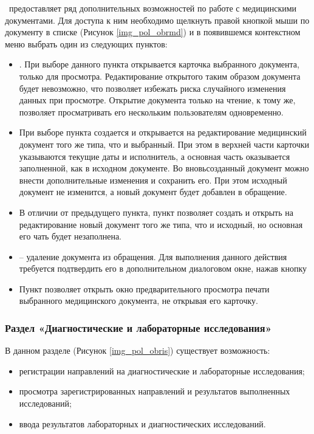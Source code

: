 \tmis~предоставляет ряд дополнительных возможностей по работе с медицинскими документами. Для доступа к ним необходимо щелкнуть правой кнопкой мыши по документу в списке (Рисунок \ref{img_pol_obrmd}) и в появившемся контекстном меню выбрать один из следующих пунктов:
\begin{itemize}
 \item {}. При выборе данного пункта открывается карточка выбранного документа, только для просмотра. Редактирование открытого таким образом документа будет невозможно, что позволяет избежать риска случайного изменения данных при просмотре. Открытие документа только на чтение, к тому же, позволяет просматривать его нескольким пользователям одновременно.  
 \item При выборе пункта  создается и открывается на редактирование медицинский документ того же типа, что и выбранный. При этом в верхней части карточки указываются текущие даты и исполнитель, а основная часть оказывается заполненной, как в исходном документе. Во вновьсозданный документ можно внести дополнительные изменения и сохранить его. При этом исходный документ не изменится, а новый документ будет добавлен в обращение.   
 \item В отличии от предыдущего пункта, пункт  позволяет создать и открыть на редактирование новый документ того же типа, что и исходный, но основная его чать будет незаполнена.
 \item {} -- удаление документа из обращения. Для выполнения данного действия требуется подтвердить его в дополнительном диалоговом окне, нажав кнопку  
 \item Пункт  позволяет открыть окно предварительного просмотра печати выбранного медицинского документа, не открывая его карточку.
\end{itemize}

  
\subsubsection{Раздел «Диагностические и лабораторные исследования»} \label{pol_obr_is}

В данном разделе (Рисунок \ref{img_pol_obris}) существует возможность:
\begin{itemize}
 \item регистрации направлений на диагностические и лабораторные исследования;
 \item просмотра зарегистрированных направлений и результатов выполненных исследований;
 \item ввода результатов лабораторных и диагностических исследований.
\end{itemize}

